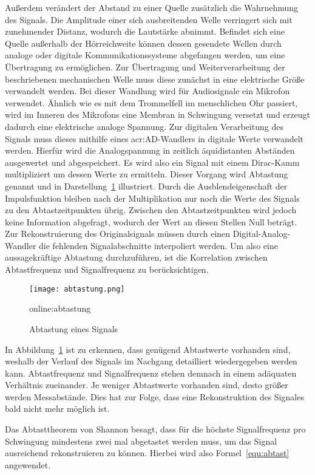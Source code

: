 Außerdem verändert der Abstand zu einer Quelle zusätzlich die Wahrnehmung des Signals. Die Amplitude einer sich ausbreitenden Welle verringert sich mit zunehmender Distanz, wodurch die Lautstärke abnimmt. Befindet sich eine Quelle außerhalb der Hörreichweite können dessen gesendete Wellen durch analoge oder digitale Kommunikationssysteme abgefangen werden, um eine Übertragung zu ermöglichen. Zur Übertragung und Weiterverarbeitung der beschriebenen mechanischen Welle muss diese zunächst in eine elektrische Größe verwandelt werden. Bei dieser Wandlung wird für Audiosignale ein Mikrofon verwendet. Ähnlich wie es mit dem Trommelfell im menschlichen Ohr passiert, wird im Inneren des Mikrofons eine Membran in Schwingung versetzt und erzeugt dadurch eine elektrische analoge Spannung.
Zur digitalen Verarbeitung des Signals muss dieses mithilfe eines \gls{acr:AD}-Wandlers in digitale Werte verwandelt werden. Hierfür wird die Analogspannung in zeitlich äquidistanten Abständen ausgewertet und abgespeichert. Es wird also ein Signal mit einem Dirac-Kamm multipliziert um dessen Werte zu ermitteln. Dieser Vorgang wird Abtastung genannt und in Darstellung~\ref{fig:abtastung} illustriert. Durch die Ausblendeigenschaft der Impulsfunktion bleiben nach der Multiplikation nur noch die Werte des Signals zu den Abtastzeitpunkten übrig. Zwischen den Abtastzeitpunkten wird jedoch keine Information abgefragt, wodurch der Wert an diesen Stellen Null beträgt. Zur Rekonstruierung des Originalsignals müssen durch einen Digital-Analog-Wandler die fehlenden Signalabschnitte interpoliert werden. Um also eine aussagekräftige Abtastung durchzuführen, ist die Korrelation zwischen Abtastfrequenz und Signalfrequenz zu berücksichtigen.


\begin{figure}[H]
	\centering
	\texttt{[image: abtastung.png]}
	\caption[Abtastung eines Signals]{Abtastung eines Signals} \gls{online:abtastung}
	\label{fig:abtastung}
\end{figure}

In Abbildung~\ref{fig:abtastung} ist zu erkennen, dass genügend Abtastwerte vorhanden sind, weshalb der Verlauf des Signals im Nachgang detailliert wiedergegeben werden kann. Abtastfrequenz und Signalfrequenz stehen demnach in einem adäquaten Verhältnis zueinander. Je weniger Abtastwerte vorhanden sind, desto größer werden Messabstände. Dies hat zur Folge, dass eine Rekonstruktion des Signales bald nicht mehr möglich ist.\cite{masteraudio}

Das Abtasttheorem von Shannon besagt, dass für die höchste Signalfrequenz pro Schwingung mindestens zwei mal abgetastet werden muss, um das Signal ausreichend rekonstruieren zu können. Hierbei wird also Formel~\ref{equ:abtast} angewendet.

